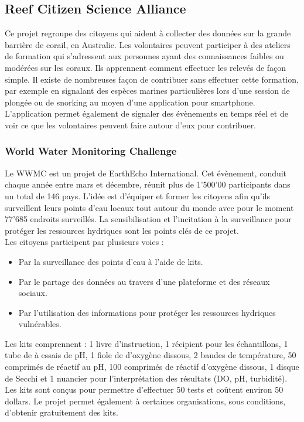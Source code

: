 \documentclass[10pt, conference, compsocconf]{llncs}
\begin{document}
		\subsection{Reef Citizen Science Alliance}
			Ce projet regroupe des citoyens qui aident à collecter des données sur la grande barrière de corail, en Australie. Les volontaires peuvent participer à des ateliers de formation qui s'adressent aux personnes ayant des connaissances faibles ou modérées sur les coraux. Ils apprennent comment effectuer les relevés de façon simple. Il existe de nombreuses façon de contribuer sans effectuer cette formation, par exemple en signalant des espèces marines particulières lors d'une session de plongée ou de snorking au moyen d'une application pour smartphone. L'application permet également de signaler des évènements en temps réel et de voir ce que les volontaires peuvent faire autour d'eux pour contribuer.
		
		\subsubsection{World Water Monitoring Challenge}
			Le WWMC est un projet de EarthEcho International. Cet évènement, conduit chaque année entre mars et décembre, réunit plus de 1'500'00 participants dans un total de 146 pays. L'idée est d'équiper et former les citoyens afin qu'ils surveillent leurs points d'eau locaux tout autour du monde avec pour le moment 77'685 endroits surveillés. La sensibilisation et l'incitation à la surveillance pour protéger les ressources hydriques sont les points clés de ce projet. \\
			Les citoyens participent par plusieurs voies :
			\begin{itemize}
				\item Par la surveillance des points d'eau à l'aide de kits.
				\item Par le partage des données au travers d'une plateforme et des réseaux sociaux.
				\item Par l'utilisation des informations pour protéger les ressources hydriques vulnérables. 
			\end{itemize}
			Les kits comprennent : 1 livre d'instruction, 1 récipient pour les échantillons, 1 tube de à essais de pH, 1 fiole de d'oxygène dissous, 2 bandes de température, 50 comprimés de réactif au pH, 100 comprimés de réactif d'oxygène dissous, 1 disque de Secchi et 1 nuancier pour l'interprétation des résultats (DO, pH, turbidité). Les kits sont conçus pour permettre d'effectuer 50 tests et coûtent environ 50 dollars. Le projet permet également à certaines organisations, sous conditions, d'obtenir gratuitement des kits.
		
\end{document}
